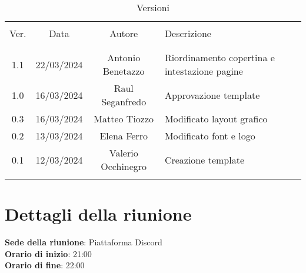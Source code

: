 \documentclass[italian,12pt]{article} %
\begin{document}


\newpage



\begin{table}[!h]
	\caption{Versioni}
	\begin{center}
		\begin{tabular}{ c c c p{9cm} }
			\hline                                                                                 \\[-2ex]
			Ver. & Data       & Autore             & Descrizione                                   \\
			\\[-2ex] \hline \\[-1.5ex]
			1.1  & 22/03/2024 & Antonio Benetazzo  & Riordinamento copertina e intestazione pagine \\
			1.0  & 16/03/2024 & Raul Seganfredo    & Approvazione template                         \\
			0.3  & 16/03/2024 & Matteo Tiozzo      & Modificato layout grafico                     \\
			0.2  & 13/03/2024 & Elena Ferro        & Modificato font e logo                        \\
			0.1  & 12/03/2024 & Valerio Occhinegro & Creazione template                            \\
			\\[-1.5ex] \hline
		\end{tabular}
	\end{center}
\end{table}

\newpage

\tableofcontents

\newpage

\section{Dettagli della riunione}


\textbf{Sede della riunione}: Piattaforma Discord\\
\textbf{Orario di inizio}: 21:00\\
\textbf{Orario di fine}: 22:00\\
\end{document}
